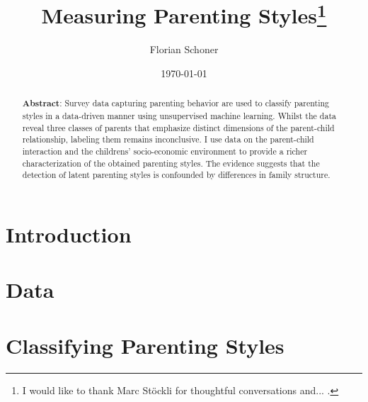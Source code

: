 \documentclass[a4paper,captions=tableheading,12pt]{scrartcl}
\title{Measuring Parenting Styles\thanks{I would like to thank Marc Stöckli for thoughtful conversations and... .}}
\author{
	\large Florian Schoner
}
\date{\large \today}
\begin{document}
	\maketitle
	\thispagestyle{empty}
	\begin{abstract}
		\noindent\textbf{Abstract}: Survey data capturing parenting behavior are used to classify parenting styles in a data-driven manner using unsupervised machine learning. Whilst the data reveal three classes of parents that emphasize distinct dimensions of the parent-child relationship, labeling them remains inconclusive. I use data on the parent-child interaction and the childrens' socio-economic environment to provide a richer characterization of the obtained parenting styles. The evidence suggests that the detection of latent parenting styles is confounded by differences in family structure.
		\bigskip
	\end{abstract}
	\pagebreak
	
	\section{Introduction} \label{sec:intro}
	
	
	\section{Data} \label{sec:data}
	
	
	\section{Classifying Parenting Styles} \label{sec:classifying}
	
	
\end{document}
